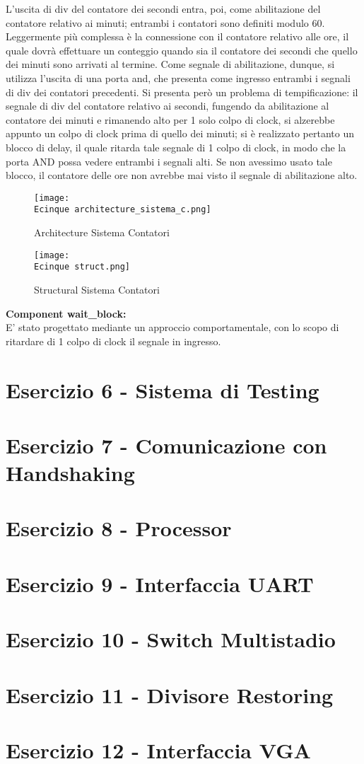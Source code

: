 \documentclass[12pt]{article}
\def \Ecinque {Allegati/Esercizio5/}
\begin{document}
L’uscita di div del contatore  dei secondi entra, poi, come abilitazione del contatore relativo ai minuti; entrambi i contatori sono definiti modulo 60.
Leggermente più complessa è la connessione con il contatore relativo alle ore, il quale dovrà effettuare un conteggio quando sia il contatore dei secondi che quello dei minuti sono arrivati al termine. Come segnale di abilitazione, dunque, si utilizza l’uscita di una porta and, che presenta come ingresso entrambi i segnali di div dei contatori precedenti.
Si presenta però un problema di tempificazione: il segnale di div del contatore relativo ai secondi, fungendo da abilitazione al contatore dei minuti e rimanendo alto per 1 solo colpo di clock, si alzerebbe appunto un colpo di clock prima di quello dei minuti; si è realizzato pertanto un blocco di delay, il quale ritarda tale segnale di 1 colpo di clock, in modo che la porta AND possa vedere entrambi i segnali alti. Se non avessimo usato tale blocco, il contatore delle ore non avrebbe mai visto il segnale di abilitazione alto.
\begin{figure}[ht]
    \centering
    \texttt{[image: \\Ecinque architecture\_sistema\_c.png]}
    \caption{Architecture Sistema Contatori}
\end{figure}
\begin{figure}[ht!]
    \centering
    \texttt{[image: \\Ecinque struct.png]}
    \caption{Structural Sistema Contatori}
\end{figure}
\clearpage
{\large \textbf{Component wait\_block:}}
\\E' stato progettato mediante un approccio comportamentale, con lo scopo di ritardare di 1 colpo di clock il segnale in ingresso.
\newpage
\section{Esercizio 6 - Sistema di Testing}
\newpage
\section{Esercizio 7 - Comunicazione con Handshaking}
\newpage
\section{Esercizio 8 - Processor}
\newpage
\section{Esercizio 9 - Interfaccia UART}
\newpage
\section{Esercizio 10 - Switch Multistadio}
\newpage
\section{Esercizio 11 - Divisore Restoring}
\newpage
\section{Esercizio 12 - Interfaccia VGA}

\newpage
\listoffigures
\end{document}
